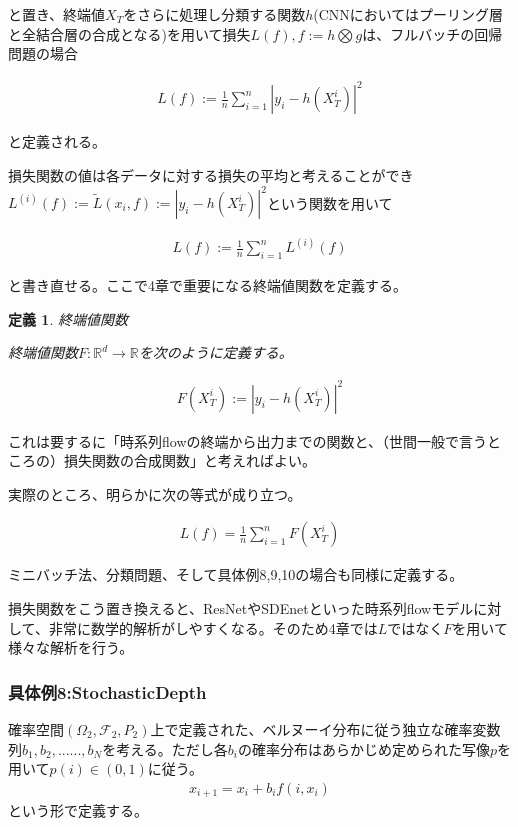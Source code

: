 \documentclass{jsarticle}
\newtheorem{defi}{定義}[section]
\begin{document}
と置き、終端値$X_T$をさらに処理し分類する関数$h$(CNNにおいてはプーリング層と全結合層の合成となる)を用いて損失$L(f),f:=h\bigotimes g$は、フルバッチの回帰問題の場合

\begin{align}
L(f):=\frac{1}{n}\sum^n_{i=1}|y_i-h(X^i_T)|^2
\end{align}

と定義される。

損失関数の値は各データに対する損失の平均と考えることができ$L^{(i)}(f):=\tilde{L}(x_i,f):=|y_i-h(X^i_T)|^2$という関数を用いて

\begin{align}
L(f):=\frac{1}{n}\sum^n_{i=1} L^{(i)}(f)
\end{align}

と書き直せる。ここで4章で重要になる終端値関数を定義する。

\begin{defi} 終端値関数


終端値関数$F:\mathbb{R}^d\to\mathbb{R}$を次のように定義する。

\begin{align}
F(X^i_T):=|y_i-h(X^i_T)|^2
\end{align}


\end{defi}

これは要するに「時系列flowの終端から出力までの関数と、（世間一般で言うところの）損失関数の合成関数」と考えればよい。

実際のところ、明らかに次の等式が成り立つ。

\begin{align}
L(f)=\frac{1}{n}\sum^n_{i=1} F(X^i_T)
\end{align}

ミニバッチ法、分類問題、そして具体例8,9,10の場合も同様に定義する。

損失関数をこう置き換えると、ResNetやSDEnetといった時系列flowモデルに対して、非常に数学的解析がしやすくなる。そのため4章では$L$ではなく$F$を用いて様々な解析を行う。


\subsubsection{具体例8:StochasticDepth}
確率空間$(\Omega_2,\mathcal{F}_2,P_2)$上で定義された、ベルヌーイ分布に従う独立な確率変数列$b_1,b_2,......,b_N$を考える。ただし各$b_i$の確率分布はあらかじめ定められた写像$p$を用いて$p(i)\in(0,1)$に従う。
\begin{align}
x_{i+1}=x_{i}+b_i f(i,x_i)
\end{align}
という形で定義する。
\end{document}
